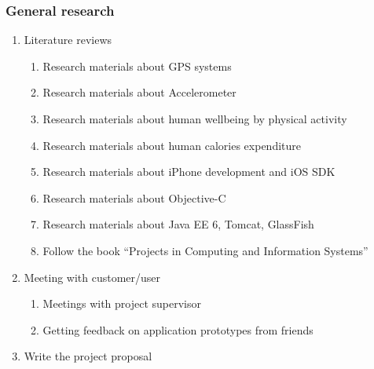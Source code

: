 \documentclass[12pt, a4paper]{report}   %
\begin{document}
\subsubsection{General research}
\begin{enumerate}
	\item Literature reviews
		\begin{enumerate}
			\item Research materials about GPS systems
			\item Research materials about Accelerometer
			\item Research materials about human wellbeing by physical activity
			\item Research materials about human calories expenditure
			\item Research materials about iPhone development and iOS SDK
			\item Research materials about Objective-C
			\item Research materials about Java EE 6, Tomcat, GlassFish  
			\item Follow the book “Projects in Computing and Information Systems”
		\end{enumerate}
	\item Meeting with customer/user
		\begin{enumerate}
			\item Meetings with project supervisor
			\item Getting feedback on application prototypes from friends
		\end{enumerate}
	\item Write the project proposal
\end{enumerate}

\end{document}
